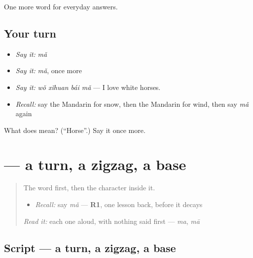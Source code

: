 \begin{grammarlens}[title={What you've built}]
One more word for everyday answers.
\end{grammarlens}

\subsection*{Your turn}
\begin{itemize}
\raggedright
  \item \emph{Say it:} \emph{mǎ}
  \item \emph{Say it:} \emph{mǎ}, once more
  \item \emph{Say it:} \emph{wǒ xǐhuan bái mǎ} — I love white horses.
  \item \emph{Recall:} say the Mandarin for snow, then the Mandarin for wind, then say \emph{mǎ} again
\end{itemize}

\begin{tcolorbox}[breakable,colback=teal!4,colframe=teal!35!black,title={Before you move on}]
What does  mean? (\textquotedblleft{}Horse\textquotedblright{}.) Say it once more.
\end{tcolorbox}
\section[\texorpdfstring{\zh{马} (mǎ)}{马 (mǎ)}]{ — a turn, a zigzag, a base}

\label{lesson:ZH-W67-ma-horse}



\begin{quote}
The word first, then the character inside it.

\begin{itemize}
\raggedright
  \item \emph{Recall:} say \emph{mǎ} — \textbf{R1}, one lesson back, before it decays
\end{itemize}

\begin{quote}
 
\end{quote}

\emph{Read it:} each one aloud, with nothing said first — \emph{ma}, \emph{mā}
\end{quote}

\subsection*{Script — a turn, a zigzag, a base}

